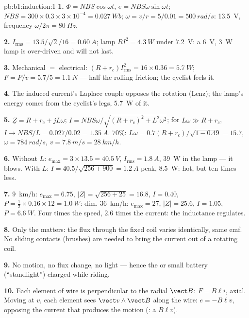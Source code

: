 \begin{solution}{pb:b1:induction:1}
\textbf{1.} $\Phi = NBS\cos\omega t$, $e = NBS\omega\sin\omega t$; $NBS = 300 \times
0.3 \times 3 \times 10^{-4} = \qty{0.027}{Wb}$; $\omega = v/r = 5/0.01 = \qty{500}{rad/s}$:
 \qty{13.5}{V}, frequency $\omega/2\pi = \qty{80}{Hz}$.

\textbf{2.} $I_{\text{rms}} = 13.5/\sqrt2/16 = \qty{0.60}{A}$; lamp $RI^2 = \qty{4.3}{W}$
under \qty{7.2}{V}: a \qty{6}{V}, \qty{3}{W} lamp is over-driven and will not
last.

\textbf{3.} Mechanical $=$ electrical: $(R + r_c)I_{\text{rms}}^2 = 16 \times 0.36 =
\qty{5.7}{W}$; $F = P/v = 5.7/5 = \qty{1.1}{N}$ --- half the rolling friction;
the cyclist feels it.

\textbf{4.} The induced current's Laplace couple opposes the rotation
(Lenz); the lamp's energy comes from the cyclist's legs, \qty{5.7}{W} of it.

\textbf{5.} $\underline Z = R + r_c + jL\omega$; $I = NBS\omega/\sqrt{(R + r_c)^2 + L^2\omega^2}$;
for $L\omega \gg R + r_c$, $I \to NBS/L = 0.027/0.02 = \qty{1.35}{A}$. $70\%$: $L\omega
= 0.7(R + r_c)/\sqrt{1 - 0.49} = 15.7$, $\omega = \qty{784}{rad/s}$, $v = \qty{7.8}{m/s}
= \qty{28}{km/h}$.

\textbf{6.} Without $L$: $e_{\max} = 3 \times 13.5 = \qty{40.5}{V}$, $I_{\text{rms}} =
\qty{1.8}{A}$, \qty{39}{W} in the lamp --- it blows. With $L$: $I = 40.5/\sqrt{256 +
900} = \qty{1.2}{A}$ peak, \qty{8.5}{W}: hot, but ten times less.

\textbf{7.} \qty{9}{km/h}: $e_{\max} = 6.75$, $|Z| = \sqrt{256 + 25} = 16.8$, $I = 0.40$,
$P = \tfrac12 \times 0.16 \times 12 = \qty{1.0}{W}$: dim. \qty{36}{km/h}: $e_{\max} = 27$,
$|Z| = 25.6$, $I = 1.05$, $P = \qty{6.6}{W}$. Four times the speed, $2.6$ times
the current: the inductance regulates.

\textbf{8.} Only the  matters: the flux through the fixed
coil varies identically, same emf. No sliding contacts (brushes) are
needed to bring the current out of a rotating coil.

\textbf{9.} No motion, no flux change, no light --- hence the  or
small battery (``standlight'') charged while riding.

\textbf{10.} Each element of wire is perpendicular to the radial $\vect B$:
$F = B\ell i$, axial. Moving at $v$, each element sees $\vect v\wedge\vect B$
along the wire: $e = -B\ell v$, opposing the current that produces the
motion (: a  $B\ell v$).


\end{solution}
